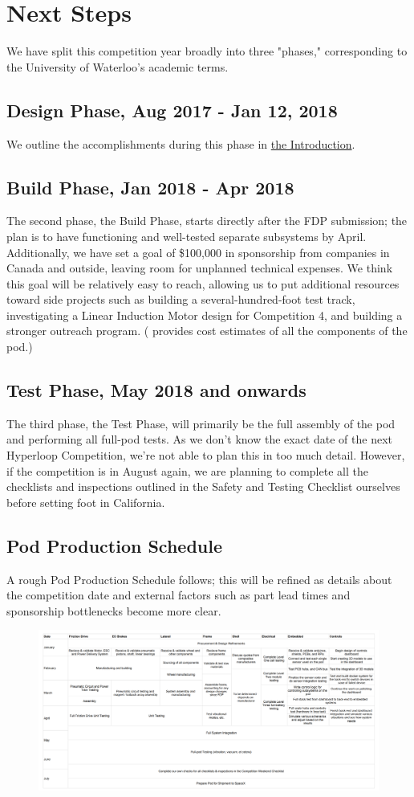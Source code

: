 \documentclass[main.tex]{subfiles}
\begin{document}
    \chapter{Next Steps}
    \label{ch:next-steps}
    We have split this competition year broadly into three "phases," corresponding to the University of Waterloo's academic terms.
    
    \section{Design Phase, Aug 2017 - Jan 12, 2018}
    We outline the accomplishments during this phase in \hyperref[ch:intro]{the Introduction}.
    
    \section{Build Phase, Jan 2018 - Apr 2018}
    The second phase, the Build Phase, starts directly after the FDP submission; the plan is to have functioning and well-tested separate subsystems by April. Additionally, we have set a goal of \$100,000 in sponsorship from companies in Canada and outside, leaving room for unplanned technical expenses. We think this goal will be relatively easy to reach, allowing us to put additional resources toward side projects such as building a several-hundred-foot test track, investigating a Linear Induction Motor design for Competition 4, and building a stronger outreach program. ( provides cost estimates of all the components of the pod.)
    
	\section{Test Phase, May 2018 and onwards}
    The third phase, the Test Phase, will primarily be the full assembly of the pod and performing all full-pod tests. As we don't know the exact date of the next Hyperloop Competition, we're not able to plan this in too much detail. However, if the competition is in August again, we are planning to complete all the checklists and inspections outlined in the Safety and Testing Checklist ourselves before setting foot in California.
    
    \section{Pod Production Schedule}
    A rough Pod Production Schedule follows; this will be refined as details about the competition date and external factors such as part lead times and sponsorship bottlenecks become more clear.
    
    \begin{figure}
        \centering
        \includegraphics[width=\textwidth]{images/productionsched.png}
        \label{fig:pps}
    \end{figure}
\end{document}
